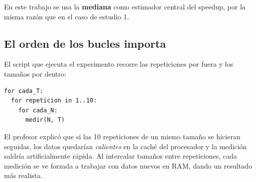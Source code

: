 En este trabajo se usa la \textbf{mediana} como estimador central del speedup, por la misma razón que en el caso de estudio 1.

\subsection{El orden de los bucles importa}

El script que ejecuta el experimento recorre las repeticiones por fuera y los tamaños por dentro:

\begin{verbatim}
for cada_T:
  for repeticion in 1..10:
    for cada_N:
      medir(N, T)
\end{verbatim}

El profesor explicó que si las 10 repeticiones de un mismo tamaño se hicieran seguidas, los datos quedarían \textit{calientes} en la caché del procesador y la medición saldría artificialmente rápida. Al intercalar tamaños entre repeticiones, cada medición se ve forzada a trabajar con datos nuevos en RAM, dando un resultado más realista.
